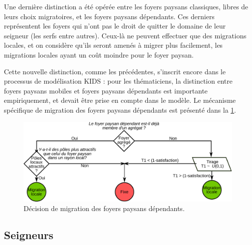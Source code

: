 Une dernière distinction a été opérée entre les foyers paysans classiques, libres de leurs choix migratoires, et les foyers paysans \og dépendants\fg{}.
Ces derniers représentent les foyers qui n'ont pas le droit de quitter le domaine de leur seigneur (les serfs entre autres).
Ceux-là ne peuvent effectuer que des migrations locales, et on considère qu'ils seront amenés à migrer plus facilement, les migrations locales ayant un \og coût\fg{} moindre pour le foyer paysan.

Cette nouvelle distinction, comme les précédentes, s'inscrit encore dans le processus de modélisation KIDS : pour les thématiciens, la distinction entre foyers paysans \og mobiles\fg{} et foyers paysans \og dépendants\fg{} est importante empiriquement, et devait être prise en compte dans le modèle.
Le mécanisme spécifique de migration des foyers paysans dépendants est présenté dans la \cref{fig:choix-migration-dependants}.


\begin{figure}[H]
	\centering
	\includegraphics[width=0.9\linewidth]{img/choix_migration_dependants.pdf}
	\caption{Décision de migration des foyers paysans dépendants.}
	\label{fig:choix-migration-dependants}
\end{figure}
 

\subsection{Seigneurs}

